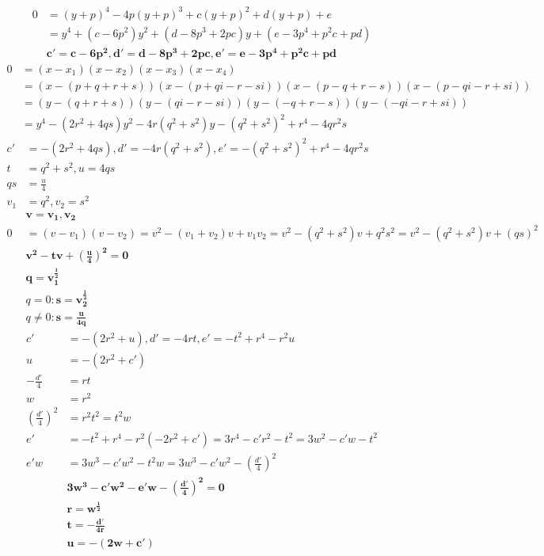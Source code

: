 \documentclass{article}
\begin{document}
\begin{align*}
  0&=(y+p)^4-4p(y+p)^3+c(y+p)^2+d(y+p)+e \\
  &=y^4+(c-6p^2)y^2+(d-8p^3+2pc)y+(e-3p^4+p^2c+pd) \\
  &\bm{c'=c-6p^2, d'=d-8p^3+2pc, e'=e-3p^4+p^2c+pd}
\end{align*}
\begin{align*}
  0&=(x-x_1)(x-x_2)(x-x_3)(x-x_4) \\
  &=(x-(p+q+r+s))(x-(p+qi-r-si))(x-(p-q+r-s))(x-(p-qi-r+si)) \\
  &=(y-(q+r+s))(y-(qi-r-si))(y-(-q+r-s))(y-(-qi-r+si)) \\
  &=y^4-(2r^2+4qs)y^2-4r(q^2+s^2)y-(q^2+s^2)^2+r^4-4qr^2s
\end{align*}
\begin{align*}
  c'&=-(2r^2+4qs), d'=-4r(q^2+s^2), e'=-(q^2+s^2)^2+r^4-4qr^2s\\
  t&=q^2+s^2, u=4qs \\
  qs&=\frac{u}{4} \\
  v_1&=q^2, v_2=s^2 \\
  &\bm{v=v_1, v_2} \\
  0&=(v-v_1)(v-v_2)=v^2-(v_1+v_2)v+v_1v_2=v^2-(q^2+s^2)v+q^2s^2=v^2-(q^2+s^2)v+(qs)^2 \\
  &\bm{v^2-tv+\left(\frac{u}{4}\right)^2=0} \\
  &\bm{q=v_1^\frac{1}{2}} \\
  &q=0: \bm{s=v_2^\frac{1}{2}} \\
  &q\neq0: \bm{s=\frac{u}{4q}}
\end{align*}
\begin{align*}
  c'&=-(2r^2+u), d'=-4rt, e'=-t^2+r^4-r^2u \\
  u&=-(2r^2+c') \\
  -\frac{d'}{4}&=rt \\
  w&=r^2 \\
  \left(\frac{d'}{4}\right)^2&=r^2t^2=t^2w \\
  e'&=-t^2+r^4-r^2(-2r^2+c')=3r^4-c'r^2-t^2=3w^2-c'w-t^2 \\
  e'w&=3w^3-c'w^2-t^2w=3w^3-c'w^2-\left(\frac{d'}{4}\right)^2 \\
  &\bm{3w^3-c'w^2-e'w-\left(\frac{d'}{4}\right)^2=0} \\
  &\bm{r=w^\frac{1}{2}} \\
  &\bm{t=-\frac{d'}{4r}} \\
  &\bm{u=-(2w+c')} \\
\end{align*}
\end{document}

